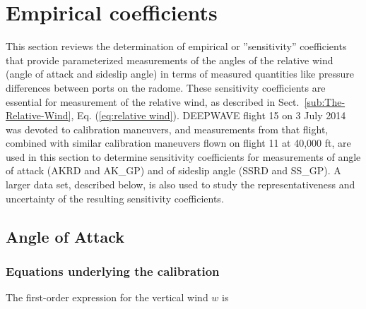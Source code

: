 \documentclass[12pt,twoside,english]{article}\usepackage[]{graphicx}\usepackage[]{color}
\let\stdsection\section
\renewcommand{\section}{\newpage\stdsection}
\let\OrgIndex\index
\renewcommand*{\index}[1]{\OrgIndex{#1}}
\begin{document}
{{\section{Empirical coefficients\label{sec:Calibrations}}

This section reviews the determination of empirical or ''sensitivity'' coefficients that provide parameterized measurements of the angles of the relative wind (angle of attack and sideslip angle) in terms of measured quantities like pressure differences between ports on the radome. These sensitivity coefficients are essential for measurement of the relative wind, as described in Sect.~\ref{sub:The-Relative-Wind}, Eq. (\ref{eq:relative wind}). DEEPWAVE flight 15 on 3 July 2014 was devoted to calibration maneuvers, and measurements from that flight, combined with similar calibration maneuvers flown on flight 11 at 40,000 ft, are used in this section to determine sensitivity coefficients for measurements of angle of attack (AKRD and AK\_GP) and of sideslip angle (SSRD and SS\_GP). A larger data set, described below, is also used to study the representativeness and uncertainty of the resulting sensitivity coefficients.






\subsection{Angle of Attack\label{sub:Calibration-AOA}}


\subsubsection{Equations underlying the calibration}

The first-order expression for the vertical wind $w$ is 

}}
\end{document}
